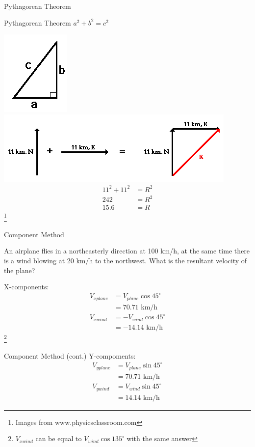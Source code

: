 \documentclass[aspectratio=43]{beamer}
\newcommand\blfootnote[1]{%
	\begingroup
	\renewcommand\thefootnote{}\footnote{#1}%
	\addtocounter{footnote}{-1}%
	\endgroup
}
\begin{document}
\begin{frame}{Pythagorean Theorem}
	\begin{block}{Pythagorean Theorem}
		$ a^2 + b^2 = c^2$
	\end{block}
	\includegraphics[scale=0.3]{pytha.png}  \\
	\includegraphics[scale=0.3]{pythaexample.png}
	\centering 
	\begin{align*}
		11^2 + 11^2 &= R^2\\
		242 &= R^2\\
		15.6 &= R
	\end{align*}
	\blfootnote{Images from www.physicsclassroom.com}
\end{frame}

\begin{frame}{Component Method}
	\begin{example}
		An airplane flies in a northeasterly direction at 100 km/h, at the same time there is a wind blowing at 20 km/h to the northwest. What is the resultant velocity of the plane?
	\end{example}
	X-components:
	\begin{align*}
		V_{xplane} &= V_{plane} \cos 45^\circ \\
		&= 70.71 \text{ km/h}	\\
		V_{xwind} &= -V_{wind}  \cos 45^\circ \\
		&= -14.14 \text{ km/h}
	\end{align*}
	\blfootnote{$V_{xwind}$ can be equal to $V_{wind} \cos 135^\circ$ with the same answer}
\end{frame}

\begin{frame}{Component Method (cont.)}
	Y-compoments:
	\begin{align*}
		V_{yplane} &= V_{plane} \sin 45^\circ \\
		&= 70.71 \text{ km/h} \\
		V_{ywind} &= V_{wind}  \sin 45^\circ \\
		&= 14.14 \text{ km/h}
	\end{align*}

\end{frame}
\end{document}

